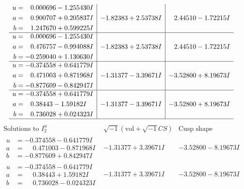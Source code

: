 \documentclass[1p]{elsarticle_modified}
\theoremstyle{definition}
\newcommand{\I}{\sqrt{-1}}
\begin{document}
$$\begin{array}{c|c|c}
\begin{aligned}
u &= \phantom{-}0.000696 - 1.255430 I \\
a &= \phantom{-}0.900707 + 0.205837 I \\
b &= \phantom{-}1.247670 + 0.599225 I\end{aligned}
 & -1.82383 + 2.53738 I & \phantom{-}2.44510 - 1.72215 I \\ \hline\begin{aligned}
u &= \phantom{-}0.000696 - 1.255430 I \\
a &= \phantom{-}0.476757 - 0.994088 I \\
b &= -0.259040 + 1.130630 I\end{aligned}
 & -1.82383 + 2.53738 I & \phantom{-}2.44510 - 1.72215 I \\ \hline\begin{aligned}
u &= -0.374558 + 0.641779 I \\
a &= \phantom{-}0.471003 + 0.871968 I \\
b &= -0.877609 - 0.842947 I\end{aligned}
 & -1.31377 - 3.39671 I & -3.52800 + 8.19673 I \\ \hline\begin{aligned}
u &= -0.374558 + 0.641779 I \\
a &= \phantom{-}0.38443 - 1.59182 I \\
b &= \phantom{-}0.736028 + 0.024323 I\end{aligned}
 & -1.31377 - 3.39671 I & -3.52800 + 8.19673 I\\
 \hline 
 \end{array}$$\newpage$$\begin{array}{c|c|c}  
\text{Solutions to }I^u_{2}& \I (\text{vol} + \sqrt{-1}CS) & \text{Cusp shape}\\
 \hline 
\begin{aligned}
u &= -0.374558 - 0.641779 I \\
a &= \phantom{-}0.471003 - 0.871968 I \\
b &= -0.877609 + 0.842947 I\end{aligned}
 & -1.31377 + 3.39671 I & -3.52800 - 8.19673 I \\ \hline\begin{aligned}
u &= -0.374558 - 0.641779 I \\
a &= \phantom{-}0.38443 + 1.59182 I \\
b &= \phantom{-}0.736028 - 0.024323 I\end{aligned}
 & -1.31377 + 3.39671 I & -3.52800 - 8.19673 I \\ \hline\begin{aligned}

\end{aligned}
\end{array}$$
\end{document}
